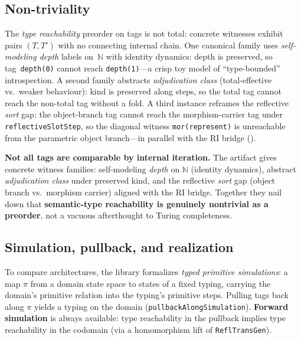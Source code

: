 \documentclass[11pt]{article}
\theoremstyle{plain}
\theoremstyle{definition}
\theoremstyle{remark}
\begin{document}
\subsection*{Non-triviality}

The \emph{type reachability} preorder on tags is not total: concrete witnesses exhibit
pairs $(T,T')$ with no connecting internal chain.  One canonical family uses
\emph{self-modeling depth} labels on~$\mathbb{N}$ with identity dynamics: depth is
preserved, so tag~\texttt{depth(0)} cannot reach \texttt{depth(1)}---a crisp toy model of
``type-bounded'' introspection.  A second family abstracts \emph{adjudication class}
(total-effective vs.\ weaker behaviour): kind is preserved along steps, so the total tag
cannot reach the non-total tag without a fold.  A third instance reframes the reflective
\emph{sort} gap: the object-branch tag cannot reach the morphism-carrier tag under
\texttt{reflectiveSlotStep}, so the diagonal witness \texttt{mor(represent)} is unreachable
from the parametric object branch---in parallel with the RI bridge ().

\begin{keybox}[title={The type preorder is provably nontrivial}]
\textbf{Not all tags are comparable by internal iteration.}  The artifact gives concrete
witness families: self-modeling \emph{depth} on $\mathbb{N}$ (identity dynamics), abstract
\emph{adjudication class} under preserved kind, and the reflective \emph{sort} gap
(object branch vs.\ morphism carrier) aligned with the RI bridge.  Together they nail
down that \textbf{semantic-type reachability is genuinely nontrivial as a preorder}, not a
vacuous afterthought to Turing completeness.
\end{keybox}

\subsection*{Simulation, pullback, and realization}

To compare architectures, the library formalizes \emph{typed primitive simulations}: a map
$\pi$ from a domain state space to states of a fixed typing, carrying the domain's primitive
relation into the typing's primitive steps.  Pulling tags back along $\pi$ yields a typing
on the domain (\texttt{pullbackAlongSimulation}).  \textbf{Forward simulation} is always
available: type reachability in the pullback implies type reachability in the codomain
(via a homomorphism lift of \texttt{ReflTransGen}).
\end{document}
